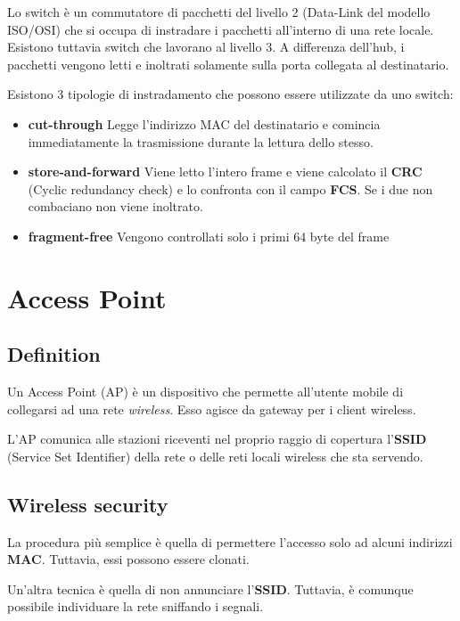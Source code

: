 \documentclass{article}
\begin{document}
Lo switch è un commutatore di pacchetti del livello 2 (Data-Link del modello ISO/OSI)
che si occupa di instradare i pacchetti all'interno di una rete locale.
Esistono tuttavia switch che lavorano al livello 3.
A differenza dell'hub, i pacchetti vengono letti e inoltrati solamente sulla porta collegata al destinatario.

Esistono 3 tipologie di instradamento che possono essere utilizzate da uno switch:

\begin{itemize}
    \item \textbf{cut-through} Legge l'indirizzo MAC del destinatario e comincia immediatamente la trasmissione
        durante la lettura dello stesso.
    \item \textbf{store-and-forward} Viene letto l'intero frame e viene calcolato il \textbf{CRC} (Cyclic redundancy check)
        e lo confronta con il campo \textbf{FCS}. Se i due non combaciano non viene inoltrato.
    \item \textbf{fragment-free} Vengono controllati solo i primi 64 byte del frame
\end{itemize}

\section{Access Point}

\subsection{Definition}

Un Access Point (AP) è un dispositivo che permette all'utente mobile di collegarsi ad una rete
\textit{wireless}. Esso agisce da gateway per i client wireless.

L'AP comunica alle stazioni riceventi nel proprio raggio di copertura l'\textbf{SSID} (Service Set Identifier)
della rete o delle reti locali wireless che sta servendo.

\pagebreak

\subsection{Wireless security}

La procedura più semplice è quella di permettere l'accesso solo ad alcuni indirizzi \textbf{MAC}.
Tuttavia, essi possono essere clonati.

Un'altra tecnica è quella di non annunciare l'\textbf{SSID}. Tuttavia, è comunque possibile
individuare la rete sniffando i segnali.
\end{document}
